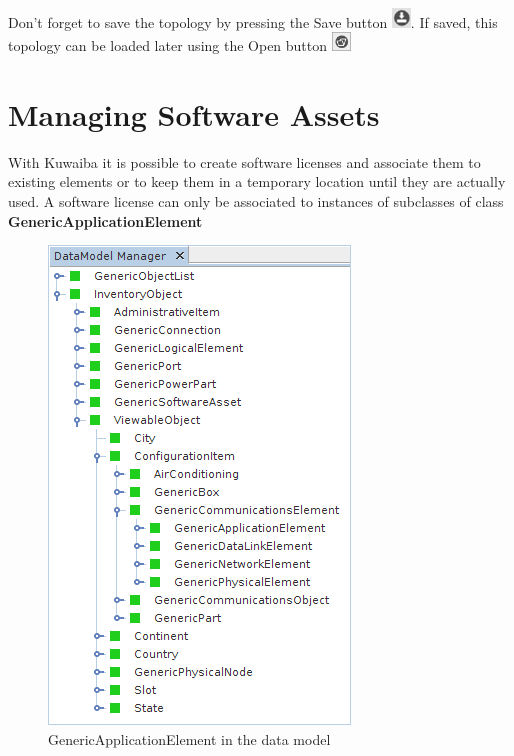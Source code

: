 \documentclass[a4paper]{article}
\begin{document}
		Don't forget to save the topology by pressing the Save button \includegraphics[width=0.5cm]{img/icon_save.png}. If saved, this topology can be loaded later using the Open button  \includegraphics[width=0.5cm]{img/icon_open.png}
	
	\newpage
    \section{Managing Software Assets} \label{sec:software_assets}
	    
	    With  Kuwaiba it is possible to create  software  licenses  and  associate  them  to  existing elements  or  to  keep  them  in  a  temporary  location  until  they  are  actually  used.  A  software license can only be associated to instances of subclasses of class \textbf{GenericApplicationElement}
	    \begin{figure}[h!]
	    	\centering
	    	\includegraphics[width=0.5\linewidth]{img/software_asset_generic_application_element.png}
	    	\caption{GenericApplicationElement in the  data model}
	    	\label{fig:software_asset_generic_application_element}
	    \end{figure}
	    
\end{document}
